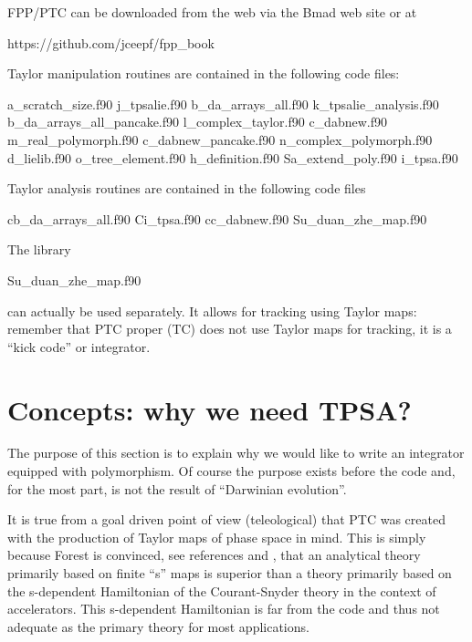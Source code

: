\documentclass{hitec}     %
\newcommand{\Section}[1]{\section{#1}\vspace*{-1ex}}
\begin{document}
{{{FPP/PTC can be downloaded from the web via the Bmad web site\cite{b:bmad} or at
\begin{code}
https://github.com/jceepf/fpp_book
\end{code}

Taylor manipulation routines are contained in the following code files:
\begin{code}
a_scratch_size.f90                j_tpsalie.f90           
b_da_arrays_all.f90               k_tpsalie_analysis.f90
b_da_arrays_all_pancake.f90       l_complex_taylor.f90    
c_dabnew.f90                      m_real_polymorph.f90    
c_dabnew_pancake.f90              n_complex_polymorph.f90
d_lielib.f90                      o_tree_element.f90      
h_definition.f90                  Sa_extend_poly.f90     
i_tpsa.f90
\end{code}

Taylor analysis routines are contained in the following code files
\begin{code}
cb_da_arrays_all.f90               Ci_tpsa.f90
cc_dabnew.f90                      Su_duan_zhe_map.f90
\end{code}

{\color{h}
The library 
\begin{code}
             Su_duan_zhe_map.f90
\end{code}
can actually be used separately. It allows for   tracking using Taylor maps: remember that PTC proper (TC) does not use Taylor maps for tracking, it is a ``kick code'' or integrator.}
\Section{Concepts: why we need TPSA?}
\label{s:concepts}

The purpose of this section is to explain why we would like to write an integrator equipped with polymorphism. Of course the purpose exists before the code and, for the most part, is not the result of ``Darwinian evolution''. 


 It is true from a goal driven point of view (teleological) that PTC was created with  the production of Taylor maps of phase space in mind. This is simply because Forest is convinced, see references \cite{thebook} and \cite{thenewbook}, that an analytical theory primarily based on finite ``s'' maps is superior than a theory primarily based on the  s-dependent Hamiltonian of the Courant-Snyder theory in the context of accelerators. This s-dependent Hamiltonian is far from the code and thus not adequate as the primary theory for most applications. 
 
}}}
\end{document}
